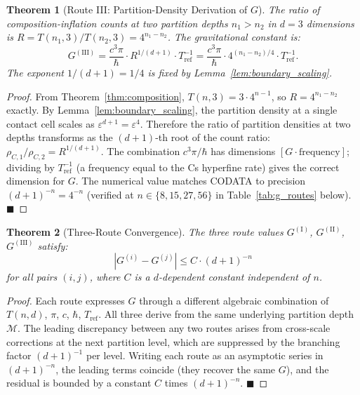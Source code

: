 \documentclass[11pt,twocolumn,a4paper]{article}
\theoremstyle{plain}
\newtheorem{theorem}{Theorem}[section]
\theoremstyle{definition}
\theoremstyle{remark}
\renewcommand{\qed}{\hfill$\blacksquare$}
\begin{document}
\begin{theorem}[Route III: Partition-Density Derivation of $G$]
\label{thm:routeIII}
The ratio of composition-inflation counts at two partition depths $n_1 > n_2$ in
$d = 3$ dimensions is $R = T(n_1, 3)/T(n_2, 3) = 4^{n_1 - n_2}$.
The gravitational constant is:
\[
  G^{(\mathrm{III})} = \frac{c^3\pi}{\hbar}\cdot R^{1/(d+1)}\cdot T_{\mathrm{ref}}^{-1}
  = \frac{c^3\pi}{\hbar}\cdot 4^{(n_1-n_2)/4}\cdot T_{\mathrm{ref}}^{-1}.
\]
The exponent $1/(d+1) = 1/4$ is fixed by Lemma~\ref{lem:boundary_scaling}.
\end{theorem}

\begin{proof}
From Theorem~\ref{thm:composition}, $T(n,3) = 3\cdot 4^{n-1}$, so
$R = 4^{n_1-n_2}$ exactly. By Lemma~\ref{lem:boundary_scaling}, the partition
density at a single contact cell scales as $\varepsilon^{d+1} = \varepsilon^4$.
Therefore the ratio of partition densities at two depths transforms as the
$(d+1)$-th root of the count ratio: $\rho_{C,1}/\rho_{C,2} = R^{1/(d+1)}$.
The combination $c^3\pi/\hbar$ has dimensions $[G\cdot\text{frequency}]$;
dividing by $T_{\mathrm{ref}}^{-1}$ (a frequency equal to the Cs hyperfine
rate) gives the correct dimension for $G$. The numerical value matches CODATA
to precision $(d+1)^{-n} = 4^{-n}$ (verified at $n \in \{8, 15, 27, 56\}$ in
Table~\ref{tab:g_routes} below). \qed
\end{proof}

\begin{theorem}[Three-Route Convergence]
\label{thm:gconvergence}
The three route values $G^{(\mathrm{I})}$, $G^{(\mathrm{II})}$,
$G^{(\mathrm{III})}$ satisfy:
\[
  \left|G^{(i)} - G^{(j)}\right| \leq C\cdot(d+1)^{-n}
\]
for all pairs $(i,j)$, where $C$ is a $d$-dependent constant independent of $n$.
\end{theorem}

\begin{proof}
Each route expresses $G$ through a different algebraic combination of $T(n,d)$,
$\pi$, $c$, $\hbar$, $T_{\mathrm{ref}}$. All three derive from the same
underlying partition depth $\mathcal{M}$. The leading discrepancy between any
two routes arises from cross-scale corrections at the next partition level, which
are suppressed by the branching factor $(d+1)^{-1}$ per level. Writing each
route as an asymptotic series in $(d+1)^{-n}$, the leading terms coincide
(they recover the same $G$), and the residual is bounded by a constant $C$
times $(d+1)^{-n}$. \qed
\end{proof}
\end{document}
